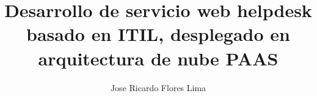 \documentclass[twoside,11pt]{Latex/Classes/PhDthesisPSnPDF}
\title{Desarrollo de servicio web helpdesk basado en ITIL, desplegado en arquitectura de nube PAAS}
\author{Jose Ricardo Flores Lima}
\begin{document}
\begin{titlepage}
\maketitle
\end{titlepage}


\frontmatter

\setcounter{secnumdepth}{3} %
\setcounter{tocdepth}{3}    %
\tableofcontents            %
\listoffigures              %
\listoftables               %


\mainmatter

 

\def\baselinestretch{1.5}                   %
   
   
\end{document}
